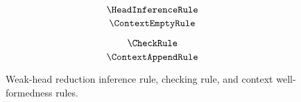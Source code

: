 
\begin{figure}
    \centering
    \begin{minipage}{0.5\textwidth}
        $$\HeadInferenceRule$$
        $$\ContextEmptyRule$$
    \end{minipage}%
    \begin{minipage}{0.5\textwidth}
        $$\CheckRule$$
        $$\ContextAppendRule$$
    \end{minipage}
    \caption{
        Weak-head reduction inference rule, checking rule, and context well-formedness rules.
    }
\end{figure}

